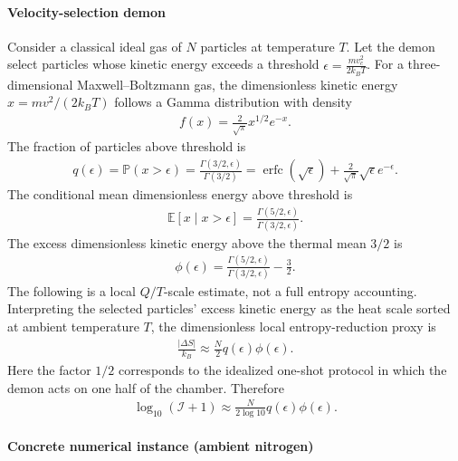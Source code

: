 \documentclass[
  aps,
  prresearch,
  reprint,
  amsmath,
  amssymb,
  superscriptaddress,
  nofootinbib,
  longbibliography
]{revtex4-2}
\def\EQSP{3pt}
\newcommand{\cgather}[2][\EQSP]{\begingroup\setlength\abovedisplayskip{#1}\setlength\belowdisplayskip{#1}\begin{gather} #2 \end{gather}\endgroup\noindent}
\newcommand{\cgathers}[2][\EQSP]{\begingroup\setlength\abovedisplayskip{#1}\setlength\belowdisplayskip{#1}\begin{gather*} #2 \end{gather*}\endgroup\noindent}
\newcommand{\Prob}{\mathbb{P}}
\newcommand{\Exp}{\mathbb{E}}
\newcommand{\calI}{\mathcal{I}}
\begin{document}
\paragraph{Velocity-selection demon}
Consider a classical ideal gas of \(N\) particles at temperature \(T\). Let the demon select particles whose kinetic energy exceeds a threshold
$    \epsilon    =     \frac{m v_c^2}{2k_B T}$. For a three-dimensional Maxwell--Boltzmann gas, the dimensionless kinetic energy \(x=mv^2/(2k_BT)\) follows a Gamma distribution with density
\cgather{
    f(x)
    =
    \frac{2}{\sqrt{\pi}}x^{1/2}e^{-x}.
}
The fraction of particles above threshold is
\cgathers{
    q(\epsilon)
    =
    \Prob(x>\epsilon)
    =
    \frac{\Gamma(3/2,\epsilon)}{\Gamma(3/2)}
    =
    \operatorname{erfc}(\sqrt{\epsilon})
    +
    \frac{2}{\sqrt{\pi}}\sqrt{\epsilon}e^{-\epsilon}.
}
The conditional mean dimensionless energy above threshold is
\cgather{
    \Exp[x\mid x>\epsilon]
    =
    \frac{\Gamma(5/2,\epsilon)}{\Gamma(3/2,\epsilon)}.
}
The excess dimensionless kinetic energy above the thermal mean \(3/2\) is
\cgather{
    \phi(\epsilon)
    =
    \frac{\Gamma(5/2,\epsilon)}{\Gamma(3/2,\epsilon)}
    -
    \frac{3}{2}.
}
The following is a local \(Q/T\)-scale estimate, not a full entropy accounting. Interpreting the selected particles' excess kinetic energy as the heat scale sorted at ambient temperature \(T\), the dimensionless local entropy-reduction proxy is
\cgather{
    \frac{|\Delta S|}{k_B}
    \approx
    \frac{N}{2}q(\epsilon)\phi(\epsilon).
    \label{eq:demon_entropy}
}
Here the factor \(1/2\) corresponds to the idealized one-shot protocol in which the demon acts on one half of the chamber. Therefore
\cgather{
    \log_{10}(\calI+1)
    \approx
    \frac{N}{2\log 10}q(\epsilon)\phi(\epsilon).
    \label{eq:demon_logI}
}

\paragraph{Concrete numerical instance (ambient nitrogen)}
\end{document}
